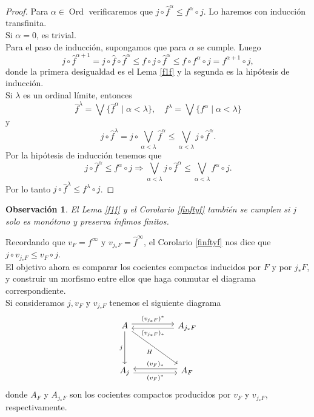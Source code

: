 \documentclass[12pt]{article}
\newtheorem{obs}[thm]{Observación}
\DeclareMathOperator{\Ord}{Ord}
\begin{document}
\begin{proof}
    Para $\alpha\in \Ord$ verificaremos que $j\circ \hat{f}^\alpha\leq f^\alpha\circ j$. Lo haremos con inducción transfinita.\\

    Si $\alpha=0$, es trivial.\\

    Para el paso de inducción, supongamos que para $\alpha$ se cumple. Luego
    \[
    j\circ \hat{f}^{\alpha+1}=j\circ \hat{f}\circ \hat{f}^{\alpha}\leq  f\circ j\circ \hat{f}^\alpha\leq f\circ f^\alpha\circ j=f^{\alpha+1}\circ j,
    \]
    donde la primera desigualdad es el Lema \ref{f1f} y la segunda es la hipótesis de inducción.\\

    Si $\lambda$ es un ordinal límite, entonces
	\[
	\hat{f}^\lambda=\bigvee\{\hat{f}^\alpha\mid \alpha<\lambda\}, \quad f^\lambda=\bigvee\{f^\alpha\mid \alpha<\lambda\} 
	\]
	y
	\[
		j\circ \hat{f}^\lambda=j\circ \bigvee_{\alpha<\lambda}\hat{f}^\alpha\leq\bigvee_{\alpha<\lambda}j\circ \hat{f}^\alpha.
	\]
	Por la hipótesis de inducción tenemos que 
	\[
	j\circ \hat{f}^\alpha\leq f^\alpha\circ j\Rightarrow \bigvee_{\alpha<\lambda}j\circ \hat{f}^\alpha\leq \bigvee_{\alpha<\lambda} f^\alpha\circ j.
	\]
	Por lo tanto $j\circ \hat{f}^\lambda\leq f^\lambda\circ j$.
\end{proof}

\begin{obs}\label{j monotono}
El Lema \ref{f1f} y el Corolario \ref{finftyf} también se cumplen si $j$ solo es monótono y preserva ínfimos finitos.
\end{obs}

Recordando que $v_F=f^\infty$ y $v_{j_*F}=\hat{f}^\infty$, el Corolario \ref{finftyf} nos dice que $j\circ v_{j_*F}\leq v_F\circ j$.\\

El objetivo ahora es comparar los cocientes compactos inducidos por $F$ y por $j_*F$, y construir un morfismo entre ellos que haga conmutar el diagrama correspondiente.\\

Si consideramos $j, v_F$ y $v_{j_*F}$ tenemos el siguiente diagrama
\begin{equation}\label{diagrama H}
    \begin{tikzcd}
	A && {A_{j_*F}} \\
	\\
	{A_j} && {A_F}
	\arrow["{(v_{j_*F})^*}", shift left, from=1-1, to=1-3]
	\arrow["j"', from=1-1, to=3-1]
	\arrow["H"', from=1-1, to=3-3]
	\arrow["{(v_{j_*F})_*}", shift left, from=1-3, to=1-1]
	\arrow["{(v_F)^*}"', shift right, from=3-1, to=3-3]
	\arrow["{(v_F)_*}"', shift right, from=3-3, to=3-1]
\end{tikzcd}
\end{equation}
donde $A_F$ y $A_{j_*F}$ son los cocientes compactos producidos por $v_F$ y $v_{j_*F}$, respectivamente.\\
\end{document}
